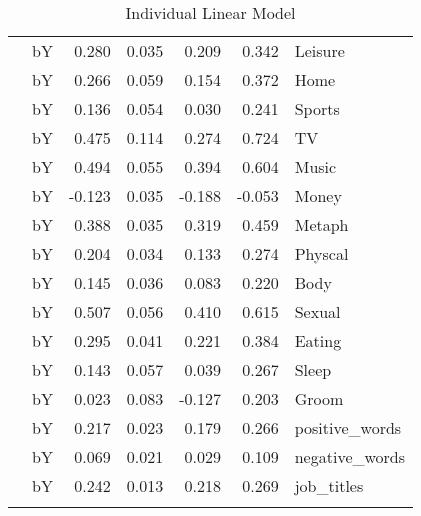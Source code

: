 \documentclass[11pt,a4paper]{article}
\begin{document}
\begin{longtable}{llrrrrl}
   & bY &  0.280 &  0.035 &    0.209 &     0.342 &         Leisure \\
   & bY &  0.266 &  0.059 &    0.154 &     0.372 &            Home \\
   & bY &  0.136 &  0.054 &    0.030 &     0.241 &          Sports \\
   & bY &  0.475 &  0.114 &    0.274 &     0.724 &              TV \\
   & bY &  0.494 &  0.055 &    0.394 &     0.604 &           Music \\
   & bY & -0.123 &  0.035 &   -0.188 &    -0.053 &           Money \\
   & bY &  0.388 &  0.035 &    0.319 &     0.459 &          Metaph \\
   & bY &  0.204 &  0.034 &    0.133 &     0.274 &         Physcal \\
   & bY &  0.145 &  0.036 &    0.083 &     0.220 &            Body \\
   & bY &  0.507 &  0.056 &    0.410 &     0.615 &          Sexual \\
   & bY &  0.295 &  0.041 &    0.221 &     0.384 &          Eating \\
   & bY &  0.143 &  0.057 &    0.039 &     0.267 &           Sleep \\
   & bY &  0.023 &  0.083 &   -0.127 &     0.203 &           Groom \\
   & bY &  0.217 &  0.023 &    0.179 &     0.266 &  positive\_words \\
   & bY &  0.069 &  0.021 &    0.029 &     0.109 &  negative\_words \\
   & bY &  0.242 &  0.013 &    0.218 &     0.269 &      job\_titles \\
\bottomrule
\caption{Individual Linear Model}
\end{longtable}
\end{document}
